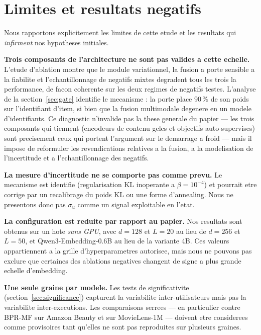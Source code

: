 \section{Limites et resultats negatifs}
\label{sec:limitations}

Nous rapportons explicitement les limites de cette etude et les resultats qui
\emph{infirment} nos hypotheses initiales.

\textbf{Trois composants de l'architecture ne sont pas valides a cette
echelle.} L'etude d'ablation montre que le module variationnel, la fusion a
porte sensible a la fiabilite et l'echantillonnage de negatifs mixtes
degradent tous les trois la performance, de facon coherente sur les deux
regimes de negatifs testes. L'analyse de la section~\ref{sec:gate} identifie le
mecanisme : la porte place 90\,\% de son poids sur l'identifiant d'item, si
bien que la fusion multimodale degenere en un modele d'identifiants. Ce
diagnostic n'invalide pas la these generale du papier --- les trois composants
qui tiennent (encodeurs de contenu geles et objectifs auto-supervises) sont
precisement ceux qui portent l'argument sur le demarrage a froid --- mais il
impose de reformuler les revendications relatives a la fusion, a la
modelisation de l'incertitude et a l'echantillonnage des negatifs.

\textbf{La mesure d'incertitude ne se comporte pas comme prevu.} Le mecanisme
est identifie (regularisation KL inoperante a $\beta=10^{-4}$) et pourrait etre
corrige par un recalibrage du poids KL ou une forme d'annealing. Nous ne
presentons donc pas $\sigma_u$ comme un signal exploitable en l'etat.

\textbf{La configuration est reduite par rapport au papier.} Nos resultats sont
obtenus sur un hote \emph{sans GPU}, avec $d=128$ et $L=20$ au lieu de $d=256$
et $L=50$, et Qwen3-Embedding-0.6B au lieu de la variante 4B. Ces valeurs
appartiennent a la grille d'hyperparametres autorisee, mais nous ne pouvons pas
exclure que certaines des ablations negatives changent de signe a plus grande
echelle d'embedding.

\textbf{Une seule graine par modele.} Les tests de significativite
(section~\ref{sec:significance}) capturent la variabilite inter-utilisateurs
mais pas la variabilite inter-executions. Les comparaisons serrees --- en
particulier contre BPR-MF sur Amazon Beauty et sur MovieLens-1M --- doivent
etre considerees comme provisoires tant qu'elles ne sont pas reproduites sur
plusieurs graines.

